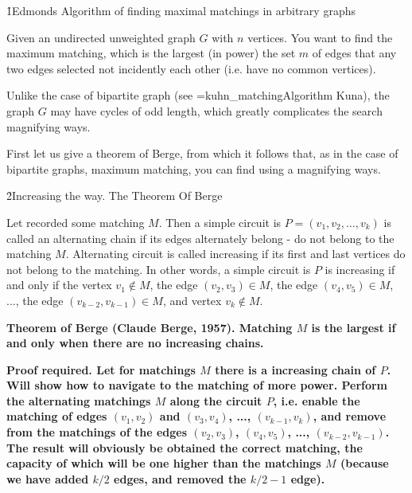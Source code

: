\h1{Edmonds Algorithm of finding maximal matchings in arbitrary graphs}

Given an undirected unweighted graph $G$ with $n$ vertices. You want to find the maximum matching, which is the largest (in power) the set $m$ of edges that any two edges selected not incidently each other (i.e. have no common vertices).

Unlike the case of bipartite graph (see \algohref=kuhn_matching{Algorithm Kuna}), the graph $G$ may have cycles of odd length, which greatly complicates the search magnifying ways.

First let us give a theorem of Berge, from which it follows that, as in the case of bipartite graphs, maximum matching, you can find using a magnifying ways.


\h2{Increasing the way. The Theorem Of Berge}

Let recorded some matching $M$. Then a simple circuit is $P = (v_1, v_2, \ldots, v_k)$ is called an alternating chain if its edges alternately belong - do not belong to the matching $M$. Alternating circuit is called increasing if its first and last vertices do not belong to the matching. In other words, a simple circuit is $P$ is increasing if and only if the vertex $v_1 \not\in M$, the edge $(v_2,v_3) \in M$, the edge $(v_4,v_5) \in M$, ..., the edge $(v_{k-2},v_{k-1}) \in M$, and vertex $v_k \not\in M$.


\bf{Theorem of Berge} (Claude Berge, 1957). Matching $M$ is the largest if and only when there are no increasing chains.

\bf{Proof required}. Let for matchings $M$ there is a increasing chain of $P$. Will show how to navigate to the matching of more power. Perform the alternating matchings $M$ along the circuit $P$, i.e. enable the matching of edges $(v_1,v_2)$ and $(v_3,v_4)$, ..., $(v_{k-1},v_k)$, and remove from the matchings of the edges $(v_2,v_3)$, $(v_4,v_5)$, ..., $(v_{k-2},v_{k-1})$. The result will obviously be obtained the correct matching, the capacity of which will be one higher than the matchings $M$ (because we have added $k/2$ edges, and removed the $k/2-1$ edge).


